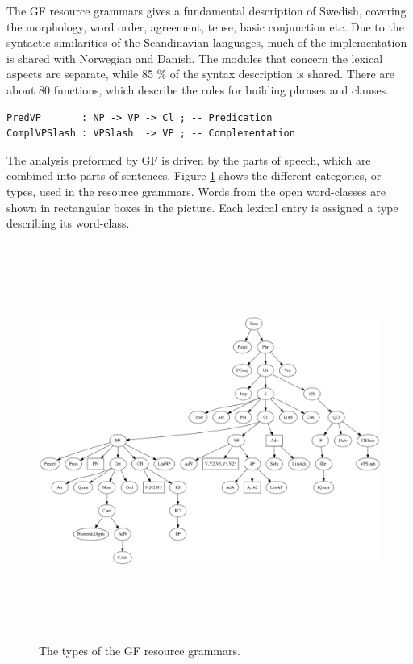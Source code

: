 \documentclass{report}
\begin{document}

The GF resource grammars gives a fundamental description of Swedish,
covering the morphology,
word order, agreement, tense, basic conjunction etc.
Due to the syntactic similarities of the Scandinavian languages, much of the implementation
is shared with Norwegian and Danish. The modules that concern the lexical
aspects are separate, while 85 \% of the syntax description is shared.
There are about 80 functions, which describe the rules for building phrases and clauses.
\begin{verbatim}
PredVP       : NP -> VP -> Cl ; -- Predication
ComplVPSlash : VPSlash  -> VP ; -- Complementation
\end{verbatim}
The analysis preformed by GF is driven by the parts of speech, which are combined into
parts of sentences.
Figure \ref{fig:gfpic} shows the different categories, or types, used in the
resource grammars. 
Words from the open word-classes are shown in rectangular boxes in
the picture. Each lexical entry is assigned a type describing its word-class.
\begin{figure}[h]
\hspace{-18mm}
\includegraphics[height=130mm]{categories.png}
\caption{The types of the GF resource grammars.}
\label{fig:gfpic}
\end{figure}
\end{document}
